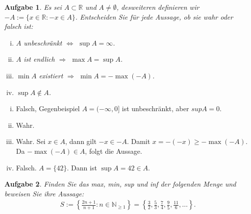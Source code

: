 \documentclass[a4paper, 20]{exam}
\newtheorem{ex}{Aufgabe}
\begin{document}
\begin{ex} Es sei $A \subset \mathbb{R}$ und $A \neq \emptyset$, desweiteren definieren wir $-A:= \lbrace x \in \mathbb{R} : -x \in A \rbrace$.  Entscheiden Sie für jede Aussage, ob sie wahr oder falsch ist: 
\begin{enumerate}[i.)]
\item
$A$ unbeschr\"ankt $\Longleftrightarrow$ $\sup A = \infty$.

\item
$A$ ist endlich $\Longrightarrow$ $\max A = \sup A$.

\item
$\min A$ existiert $\Longrightarrow$ $\min A = -\max(-A)$.

\item
$\sup A \notin A$.

\end{enumerate}
\end{ex}
\begin{solution}
\begin{enumerate}[i.)]
\item
Falsch, Gegenbeispiel $A=(-\infty, 0]$ ist unbeschr\"ankt, aber $sup A =0$. 
\item
Wahr.
\item
Wahr. Sei $x\in A$, dann gilt $-x\in -A$. Damit $x=-(-x)\geq - \max(-A)$. Da $- \max(-A)\in A$, folgt die Aussage.
\item
Falsch. $A=\{ 42 \}$. Dann ist $\sup A = 42 \in A$.
\end{enumerate}
\end{solution}

\begin{ex} Finden Sie das max, min, sup und inf der folgenden Menge und beweisen Sie ihre Aussage:
\begin{align*}
S:= \left\lbrace \frac{2n+1}{n+1} : n \in \mathbb{N}_{ \geq 1} \right\rbrace = \left \lbrace \frac{3}{2}, \frac{5}{3}, \frac{7}{4}, \frac{9}{5}, \frac{11}{6}, \dots \right\rbrace .
\end{align*}
\end{ex}
\end{document}
